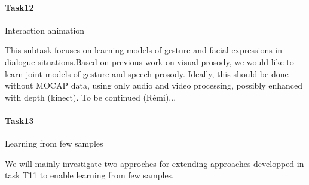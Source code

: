\paragraph{Task12} Interaction animation 

This subtask focuses on learning models of gesture and facial expressions in dialogue situations.Based on previous work on  visual prosody, we would like to learn joint models of gesture and  speech prosody. Ideally, this should be done without MOCAP data, using only audio and video processing, possibly enhanced with depth (kinect). To be continued (Rémi)...

\paragraph{Task13} Learning from few samples

We will mainly investigate two approches for extending approaches developped in task T11 to enable learning from few samples. 



